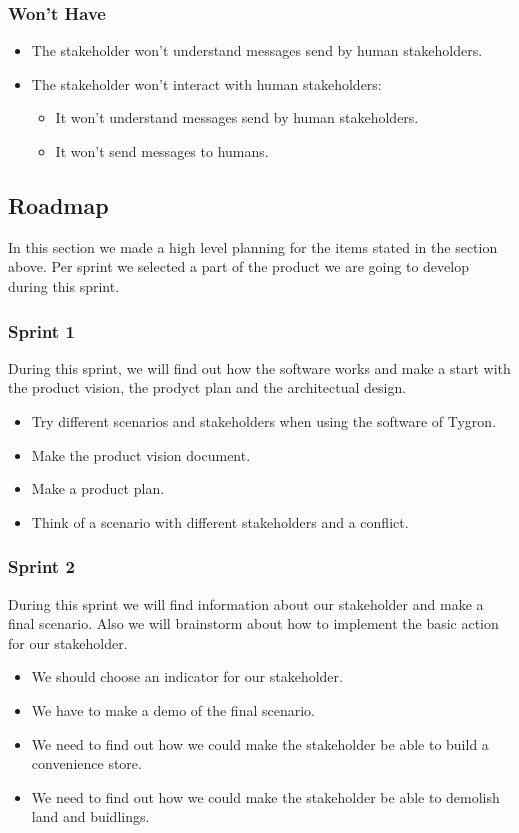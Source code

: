 \subsubsection{Won’t Have}
\begin{itemize}
	\item The stakeholder won't understand messages send by human stakeholders.
	\item The stakeholder won't interact with human stakeholders:
	\begin{itemize}
		\item It won't understand messages send by human stakeholders.
		\item It won't send messages to humans.
	\end{itemize}
\end{itemize}

\subsection{Roadmap}
In this section we made a high level planning for the items stated in the section above. Per sprint we selected a part of the product we are going to develop during this sprint. \newline

\subsubsection{Sprint 1}
During this sprint, we will find out how the software works and make a start with the product vision, the prodyct plan and the architectual design.
\begin{itemize}
	\item Try different scenarios and stakeholders when using the software of Tygron.
	\item Make the product vision document.
	\item Make a product plan.
	\item Think of a scenario with different stakeholders and a conflict.
\end{itemize}

\subsubsection{Sprint 2}
During this sprint we will find information about our stakeholder and make a final scenario. Also we will brainstorm about how to implement the basic action for our stakeholder.
\begin{itemize}
	\item We should choose an indicator for our stakeholder.
	\item We have to make a demo of the final scenario.
	\item We need to find out how we could make the stakeholder be able to build a convenience store.
	\item We need to find out how we could make the stakeholder be able to  demolish land and buidlings.
\end{itemize}

